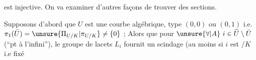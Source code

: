 est injective. On va examiner d'autres façons  de trouver des sections.

Supposons d'abord que $U$ est une courbe algébrique,   type $(0,0)$ ou $(0,1)$ i.e. $\pi_1(\bar U)=\unsure{\Pi_{U/K}|\pi_{U/K}}\ne\{0\}$ ; Alors  que pour $\unsure{\forall|A}\ i\in\widehat U\setminus\bar U$ (``pt à l'infini''), le groupe de lacets $L_i$ fournit un scindage (au moins si $i$ est $/K$ i.e fixé


